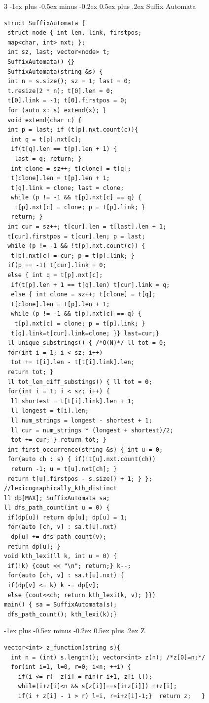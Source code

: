\documentclass[8pt,a4paper,onesided]{article}
\makeatletter
\renewcommand{\subsection}{\@startsection{subsection}{2}{0mm}
    {-1ex plus -0.5ex minus -0.2ex} %
    {0.5ex plus .2ex}                %
    {\normalfont\large\bfseries}}    %
\makeatother
\begin{document}
\begin{multicols}{3}
\subsection{Suffix Automata}
\begin{verbatim}
struct SuffixAutomata {
 struct node { int len, link, firstpos;
 map<char, int> nxt; };
 int sz, last; vector<node> t;
 SuffixAutomata() {}
 SuffixAutomata(string &s) {
 int n = s.size(); sz = 1; last = 0;
 t.resize(2 * n); t[0].len = 0;
 t[0].link = -1; t[0].firstpos = 0;
 for (auto x: s) extend(x); }
 void extend(char c) {
 int p = last; if (t[p].nxt.count(c)){
  int q = t[p].nxt[c];
  if(t[q].len == t[p].len + 1) {
   last = q; return; }
  int clone = sz++; t[clone] = t[q];
  t[clone].len = t[p].len + 1;
  t[q].link = clone; last = clone;
  while (p != -1 && t[p].nxt[c] == q) {
   t[p].nxt[c] = clone; p = t[p].link; }
  return; }
 int cur = sz++; t[cur].len = t[last].len + 1;
 t[cur].firstpos = t[cur].len; p = last;
 while (p != -1 && !t[p].nxt.count(c)) {
  t[p].nxt[c] = cur; p = t[p].link; }
 if(p == -1) t[cur].link = 0;
 else { int q = t[p].nxt[c];
  if(t[p].len + 1 == t[q].len) t[cur].link = q;
  else { int clone = sz++; t[clone] = t[q];
  t[clone].len = t[p].len + 1;
  while (p != -1 && t[p].nxt[c] == q) {
   t[p].nxt[c] = clone; p = t[p].link; }
  t[q].link=t[cur].link=clone; }} last=cur;}
 ll unique_substrings() { /*O(N)*/ ll tot = 0;
 for(int i = 1; i < sz; i++)
  tot += t[i].len - t[t[i].link].len;
 return tot; }
 ll tot_len_diff_substings() { ll tot = 0;
 for(int i = 1; i < sz; i++) {
  ll shortest = t[t[i].link].len + 1;
  ll longest = t[i].len;
  ll num_strings = longest - shortest + 1;
  ll cur = num_strings * (longest + shortest)/2;
  tot += cur; } return tot; }
 int first_occurrence(string &s) { int u = 0;
 for(auto ch : s) { if(!t[u].nxt.count(ch))
  return -1; u = t[u].nxt[ch]; }
 return t[u].firstpos - s.size() + 1; } };
//lexicographically_kth_distinct
ll dp[MAX]; SuffixAutomata sa;
ll dfs_path_count(int u = 0) {
 if(dp[u]) return dp[u]; dp[u] = 1;
 for(auto [ch, v] : sa.t[u].nxt)
  dp[u] += dfs_path_count(v);
 return dp[u]; }
void kth_lexi(ll k, int u = 0) {
 if(!k) {cout << "\n"; return;} k--;
 for(auto [ch, v] : sa.t[u].nxt) {
 if(dp[v] <= k) k -= dp[v];
 else {cout<<ch; return kth_lexi(k, v); }}}
main() { sa = SuffixAutomata(s);
 dfs_path_count(); kth_lexi(k);}
\end{verbatim}
\subsection{Z}
\begin{verbatim}
vector<int> z_function(string s){
  int n = (int) s.length(); vector<int> z(n); /*z[0]=n;*/
  for(int i=1, l=0, r=0; i<n; ++i) {
    if(i <= r)  z[i] = min(r-i+1, z[i-l]);
    while(i+z[i]<n && s[z[i]]==s[i+z[i]]) ++z[i];
    if(i + z[i] - 1 > r) l=i, r=i+z[i]-1;}  return z;   }
\end{verbatim}




\end{multicols}
\end{document}
